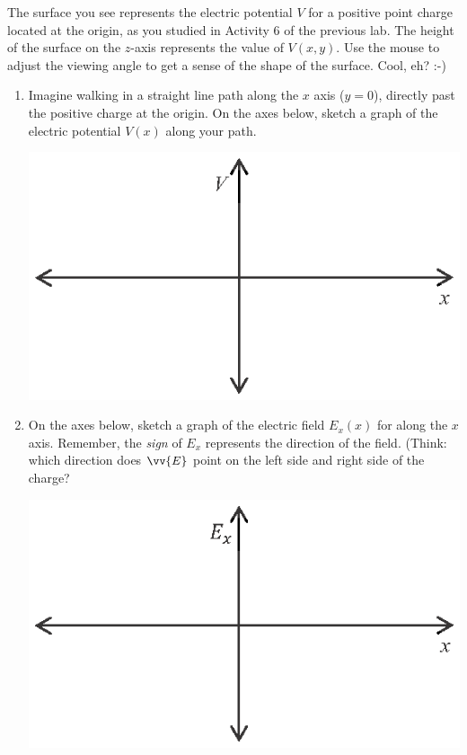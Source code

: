 The surface you see represents the electric potential $V$ for a positive point charge located at the origin, as you studied in Activity 6 of the previous lab.  The height of the surface on the $z$-axis represents the value of $V(x,y)$.  Use the mouse to adjust the viewing angle to get a sense of the shape of the surface.  Cool, eh?  :-)

\begin{enumerate}[labparts]

\item Imagine walking in a straight line path along the $x$ axis ($y=0$), directly past the positive charge at the origin.  On the axes below, sketch a graph of the electric potential $V(x)$ along your path.  
\begin{center}
\includegraphics{potential_superposition/activity_1_figs/V_axes.eps}
\end{center}

\item On the axes below, sketch a graph of the electric field $E_x(x)$ for along the $x$ axis.  Remember, the \textit{sign} of $E_x$ represents the direction of the field.  (Think: which direction does $\vv{E}$ point on the left side and right side of the charge?
\begin{center}
\includegraphics{potential_superposition/activity_1_figs/E_axes.eps}
\end{center}


\end{enumerate}
